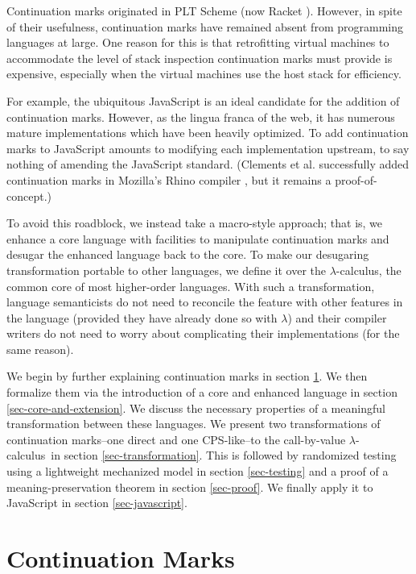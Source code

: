 \documentclass{llncs}
\newcommand{\lc}[0]{$\lambda$-calculus}
\begin{document}
Continuation marks originated in PLT Scheme (now Racket \cite{plt-tr1}). However, in spite of their usefulness, continuation marks have remained absent from programming languages at large. One reason for this is that retrofitting virtual machines to accommodate the level of stack inspection continuation marks must provide is expensive, especially when the virtual machines use the host stack for efficiency.

For example, the ubiquitous JavaScript is an ideal candidate for the addition of continuation marks. However, as the lingua franca of the web, it has numerous mature implementations which have been heavily optimized. To add continuation marks to JavaScript amounts to modifying each implementation upstream, to say nothing of amending the JavaScript standard. (Clements et al. successfully added continuation marks in Mozilla's Rhino compiler \cite{clements2008implementing}, but it remains a proof-of-concept.)

To avoid this roadblock, we instead take a macro-style approach; that is, we enhance a core language with facilities to manipulate continuation marks and desugar the enhanced language back to the core. To make our desugaring transformation portable to other languages, we define it over the \lc, the common core of most higher-order languages. With such a transformation, language semanticists do not need to reconcile the feature with other features in the language (provided they have already done so with $\lambda$) and their compiler writers do not need to worry about complicating their implementations (for the same reason).

We begin by further explaining continuation marks in section \ref{sec-continuation-marks}. We then formalize them via the introduction of a core and enhanced language in section \ref{sec-core-and-extension}. We discuss the necessary properties of a meaningful transformation between these languages. We present two transformations of continuation marks--one direct and one CPS-like--to the call-by-value \lc\ in section \ref{sec-transformation}. This is followed by randomized testing using a lightweight mechanized model in section \ref{sec-testing} and a proof of a meaning-preservation theorem in section \ref{sec-proof}. We finally apply it to JavaScript in section \ref{sec-javascript}.

\section{Continuation Marks}
\label{sec-continuation-marks}
\end{document}

